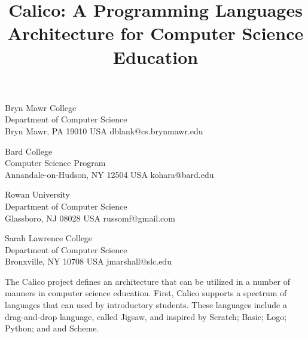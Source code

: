 \documentclass[preprint]{sigplanconf}
\begin{document}




\title{Calico: A Programming Languages Architecture for Computer Science Education}

           {Bryn Mawr College\\Department of Computer Science\\Bryn Mawr, PA 19010 USA}
           {dblank@cs.brynmawr.edu}

           {Bard College\\Computer Science Program\\Annandale-on-Hudson, NY 12504 USA}
           {kohara@bard.edu}

           {Rowan University\\Department of Computer Science\\Glassboro, NJ 08028 USA}
           {russomf@gmail.com}

           {Sarah Lawrence College\\Department of Computer Science\\Bronxville, NY 10708 USA}
           {jmarshall@slc.edu}

\maketitle

\begin{abstract}

\end{abstract}

The Calico project defines an architecture that can be utilized in a
number of manners in computer science education. First, Calico
supports a spectrum of languages that can used by introductory
students. These languages include a drag-and-drop language, called
Jigsaw, and inspired by Scratch; Basic; Logo; Python; and and Scheme.
\end{document}
